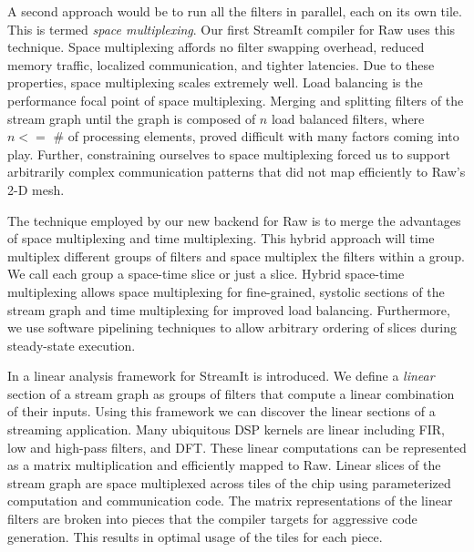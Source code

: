 \documentclass{csailabstractbook}
\begin{document}
A second approach would be to run all the filters in parallel, each on
its own tile.  This is termed {\it space multiplexing}.  Our first 
StreamIt compiler for Raw uses this technique.  Space multiplexing
affords no filter swapping overhead, reduced memory traffic,
localized communication, and tighter latencies.  Due to these
properties, space multiplexing scales extremely well.  
Load balancing is the performance focal point of space multiplexing.  Merging
and splitting filters of the stream graph until the graph is composed
of $n$ load balanced filters, where $n <=$ \# of processing
elements, proved difficult with many factors coming into play.
Further, constraining ourselves to space multiplexing forced us to
support arbitrarily complex communication patterns that did not map
efficiently to Raw's 2-D mesh.

The technique employed by our new backend for Raw is to merge the
advantages of space multiplexing and time multiplexing.  This hybrid
approach will time multiplex different groups of filters and space
multiplex the filters within a group. We call each group a space-time
slice or just a slice.  Hybrid space-time multiplexing allows space
multiplexing for fine-grained, systolic sections of the stream graph
and time
multiplexing for improved load balancing.  Furthermore, we use
software pipelining techniques to allow arbitrary ordering of slices
during steady-state execution.

In \cite{lamb03} a linear analysis framework for StreamIt is
introduced.  We define a {\it linear} section of a stream graph as
groups of filters that compute a linear combination of their inputs.
Using this framework we can discover the linear sections of a
streaming application.  Many ubiquitous DSP kernels are linear
including FIR, low and high-pass filters, and DFT.  These linear
computations can be represented as a matrix multiplication and
efficiently mapped to Raw.  Linear slices of the stream
graph are space multiplexed across tiles of the chip using
parameterized computation and communication code.  The matrix
representations of the linear filters are broken into pieces
that the compiler targets for aggressive code generation.  This
results in optimal usage of the tiles for each piece.
\end{document}
